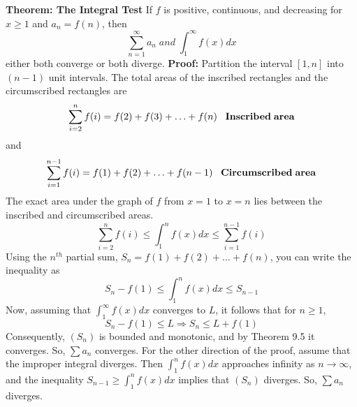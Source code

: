 \nopagenumbers
{\bf Theorem: The Integral Test}
\vskip 6pt
If $f$ is positive, continuous, and decreasing for $x \geq 1$ and $a_n=f(n)$, then $$\sum_{n=1}^\infty a_n \; and \; \int_1^\infty f(x)dx$$ either both converge or both diverge.
\vskip 10pt
{\bf Proof:}
\vskip 6pt
Partition the interval $[1,n]$ into $(n-1)$ unit intervals. The total areas of the inscribed rectangles and the circumscribed rectangles are $$\sum_{i=2}^n f(i)=f(2)+f(3)+\ldots+f(n) \;\;\; {\bf Inscribed\;area}$$ and
$$\sum_{i=1}^{n-1}f(i)=f(1)+f(2)+\ldots+f(n-1) \;\;\; {\bf Circumscribed\;area}$$ The exact area under the graph of $f$ from $x=1$ to $x=n$ lies between the inscribed and circumscribed areas. $$\sum_{i=2}^n f(i) \leq \int_1^n f(x)dx \leq \sum_{i=1}^{n-1} f(i)$$ Using the $n^{th}$ partial sum, $S_n=f(1)+f(2)+\ldots+f(n)$, you can write the inequality as $$S_n-f(1) \leq \int_1^nf(x)dx \leq S_{n-1}$$ Now, assuming that $\int_1^\infty f(x)dx$ converges to $L$, it follows that for $n \geq 1$, $$S_n-f(1) \leq L \Longrightarrow S_n \leq L+f(1)$$ Consequently, $(S_n)$ is bounded and monotonic, and by Theorem 9.5 it converges. So, $\sum a_n$ converges. For the other direction of the proof, assume that the improper integral diverges. Then $\int_1^nf(x)dx$ approaches infinity as $n\to\infty$, and the inequality $S_{n-1} \geq \int_1^nf(x)dx$ implies that $(S_n)$ diverges. So, $\sum a_n$ diverges.

\vfill\eject
